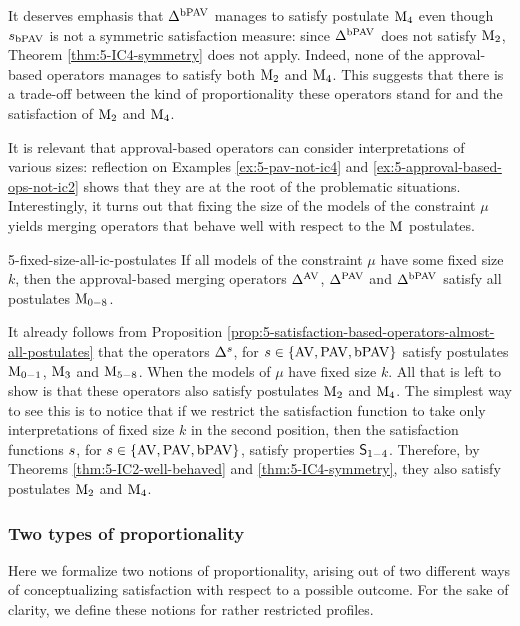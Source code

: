 It deserves emphasis that $\Delta^{\mathrm{bPAV}}$ manages to satisfy postulate $\mathrm{M}_{4}$
even though $s_{\mathrm{bPAV}}$ is not a symmetric satisfaction measure:
since $\Delta^{\mathrm{bPAV}}$ does not satisfy $\mathrm{M}_{2}$, Theorem \ref{thm:5-IC4-symmetry} does not apply.
Indeed, none of the approval-based operators manages to satisfy both $\mathrm{M}_{2}$ and $\mathrm{M}_{4}$.
This suggests that there is a trade-off between the kind of proportionality these operators
stand for 
and the satisfaction of $\mathrm{M}_{2}$ and $\mathrm{M}_{4}$.

It is relevant that approval-based operators can consider 
interpretations of various sizes:
reflection on Examples \ref{ex:5-pav-not-ic4} and \ref{ex:5-approval-based-ops-not-ic2} shows
that they are at the root of the problematic situations.
Interestingly, it turns out that fixing the size of the models of the constraint $\mu$ yields
merging operators that behave well with respect to the $\mathrm{M}_{}$ postulates.

\begin{thm}{}{5-fixed-size-all-ic-postulates}
	If all models of the constraint $\mu$ have some fixed size $k$, then
	the approval-based merging operators $\Delta^{\mathrm{AV}}$, $\Delta^{\mathrm{PAV}}$ and $\Delta^{\mathrm{bPAV}}$
	satisfy all postulates $\mathrm{M}_{0-8}$.
\end{thm}
\begin{prf*}{}{}%
	It already follows from Proposition \ref{prop:5-satisfaction-based-operators-almost-all-postulates}
	that the operators $\Delta^{s}_{}$,
	for $s\in\{{\mathrm{AV},\mathrm{PAV},\mathrm{bPAV}}\}$ satisfy postulates $\mathrm{M}_{0-1}$, $\mathrm{M}_{3}$ and $\mathrm{M}_{5-8}$.
	When the models of $\mu$ have fixed size $k$.
	All that is left to show is that these operators also satisfy postulates $\mathrm{M}_{2}$ and $\mathrm{M}_{4}$.
	The simplest way to see this is to notice that if we restrict the 
	satisfaction function to take only interpretations of fixed size $k$ in the second position,
	then the satisfaction functions $s$, for $s\in\{{\mathrm{AV},\mathrm{PAV},\mathrm{bPAV}}\}$, satisfy properties $\mathsf{S}_{1-4}$.
	Therefore, by Theorems \ref{thm:5-IC2-well-behaved} and \ref{thm:5-IC4-symmetry},
	they also satisfy postulates $\mathrm{M}_{2}$ and $\mathrm{M}_{4}$.	
\end{prf*}


\subsubsection{Two types of proportionality}
Here we formalize two notions of proportionality, 
arising out of two different ways of conceptualizing satisfaction with respect to a possible outcome.
For the sake of clarity, we define these notions for rather restricted profiles.


